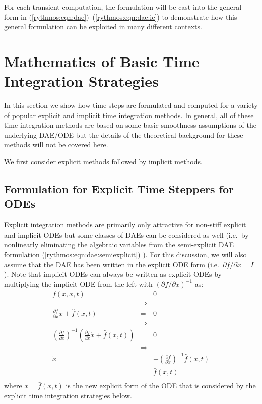 \documentclass[pdf,ps2pdf,11pt]{SANDreport}
\begin{document}
For each transient computation, the formulation will be cast into the general
form in (\ref{rythmos:eqn:dae})--(\ref{rythmos:eqn:dae:ic}) to demonstrate how
this general formulation can be exploited in many different contexts.

\section{Mathematics of Basic Time Integration Strategies}

In this section we show how time steps are formulated and computed for a
variety of popular explicit and implicit time integration methods.  In general,
all of these time integration methods are based on some basic smoothness
assumptions of the underlying DAE/ODE but the details of the theoretical
background for these methods will not be covered here.

We first consider explicit methods followed by implicit methods.

\subsection{Formulation for Explicit Time Steppers for ODEs}

Explicit integration methods are primarily only attractive for non-stiff explicit and
implicit ODEs but some classes of DAEs can be considered as well (i.e.\ by
nonlinearly eliminating the algebraic variables from the semi-explicit DAE formulation 
(\ref{rythmos:eqn:dae:semiexplicit}) \cite{BCP}).  For this discussion, we will also assume
that the DAE has been written in the explicit ODE form (i.e.\ ${}\partial f /
{}\partial {}\dot{x} = I$).  Note that implicit ODEs can always be written as
explicit ODEs by multiplying the implicit ODE from the left with $({}\partial
f / {}\partial {}\dot{x})^{-1}$ as:
%
\begin{eqnarray*}
f(\dot{x},x,t) & = & 0 \\
& \Rightarrow \\
\frac{\partial f}{\partial \dot{x}} \dot{x} + \hat{f}(x,t) & = & 0 \\
& \Rightarrow \\
\left( \frac{\partial f}{\partial \dot{x}} \right)^{-1}
\left( \frac{\partial f}{\partial \dot{x}} \dot{x} + \hat{f}(x,t) \right) & = & 0 \\
& \Rightarrow \\
\dot{x} & = & -\left( \frac{\partial f}{\partial \dot{x}} \right)^{-1} \hat{f}(x,t) \\
& = & \bar{f}(x,t) \\
\end{eqnarray*}
%
where ${}\dot{x} = \bar{f}(x,t)$ is the new explicit form of the ODE that is
considered by the explicit time integration strategies below.
\end{document}
